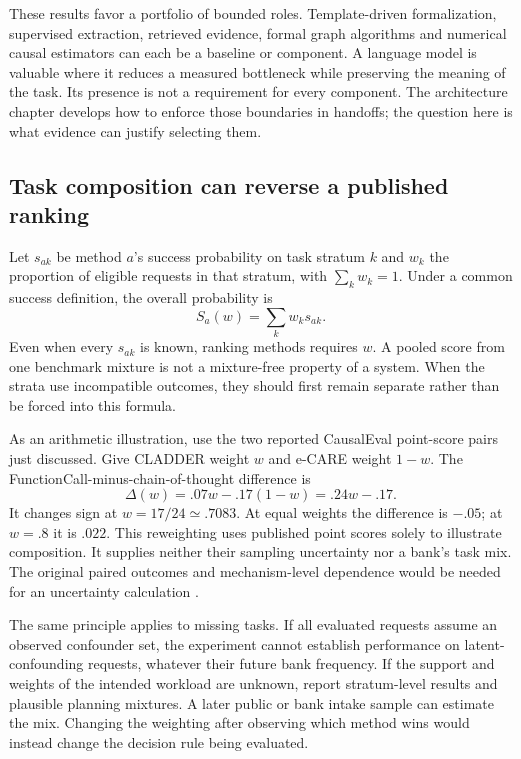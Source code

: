 These results favor a portfolio of bounded roles. Template-driven formalization,
supervised extraction, retrieved evidence, formal graph algorithms and numerical
causal estimators can each be a baseline or component. A language model is
valuable where it reduces a measured bottleneck while preserving the meaning
of the task. Its presence is not a requirement for every component. The
architecture chapter develops how to enforce those boundaries in handoffs;
the question here is what evidence can justify selecting them.

\subsection{Task composition can reverse a published ranking}

Let $s_{ak}$ be method $a$'s success probability on task stratum $k$ and $w_k$
the proportion of eligible requests in that stratum, with $\sum_k w_k=1$.
Under a common success definition, the overall probability is
\begin{equation}
 S_a(w)=\sum_k w_k s_{ak}.
 \label{exec13:frontier-mixture}
\end{equation}
Even when every $s_{ak}$ is known, ranking methods requires $w$. A pooled score
from one benchmark mixture is not a mixture-free property of a system. When
the strata use incompatible outcomes, they should first remain separate rather
than be forced into this formula.

As an arithmetic illustration, use the two reported CausalEval point-score
pairs just discussed. Give CLADDER weight $w$ and e-CARE weight $1-w$. The
FunctionCall-minus-chain-of-thought difference is
\begin{equation}
 \Delta(w)=.07w-.17(1-w)=.24w-.17.
 \label{exec13:frontier-rank}
\end{equation}
It changes sign at $w=17/24\simeq.7083$. At equal weights the difference is
$-.05$; at $w=.8$ it is $.022$. This reweighting uses published point scores
solely to illustrate composition. It supplies neither their sampling
uncertainty nor a bank's task mix. The original paired outcomes and
mechanism-level dependence would be needed for an uncertainty calculation
\cite{exec13_census_causaleval,exec13_frontier_exact}.

The same principle applies to missing tasks. If all evaluated requests assume
an observed confounder set, the experiment cannot establish performance on
latent-confounding requests, whatever their future bank frequency. If the
support and weights of the intended workload are unknown, report stratum-level
results and plausible planning mixtures. A later public or bank intake sample
can estimate the mix. Changing the weighting after observing which method wins
would instead change the decision rule being evaluated.

